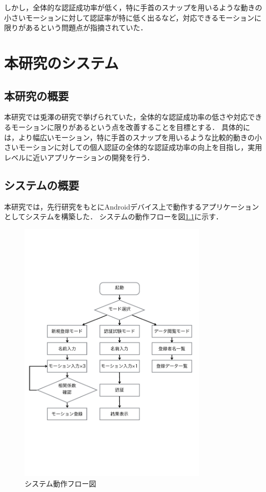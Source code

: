 \documentclass[12pt]{jreport}
\begin{document}
    しかし，全体的な認証成功率が低く，特に手首のスナップを用いるような動きの小さいモーションに対して認証率が特に低く出るなど，対応できるモーションに限りがあるという問題点が指摘されていた．

\chapter{本研究のシステム}
    \section{本研究の概要}
    本研究では兎澤の研究で挙げられていた，全体的な認証成功率の低さや対応できるモーションに限りがあるという点を改善することを目標とする．
    具体的には，より幅広いモーション，特に手首のスナップを用いるような比較的動きの小さいモーションに対しての個人認証の全体的な認証成功率の向上を目指し，実用レベルに近いアプリケーションの開発を行う．

    \section{システムの概要}
    本研究では，先行研究をもとにAndroidデバイス上で動作するアプリケーションとしてシステムを構築した．
    システムの動作フローを図\ref{flow}に示す．

    \begin{figure}[btp]
        \begin{center}
            \includegraphics[width=9cm, bb=0 183 594 670]{Flow.pdf}
            \caption{システム動作フロー図}
            \label{flow}
        \end{center}
    \end{figure}
\end{document}
